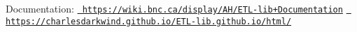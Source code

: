 Documentation\+: \href{https://wiki.bnc.ca/display/AH/ETL-lib+Documentation}{\texttt{ https\+://wiki.\+bnc.\+ca/display/\+A\+H/\+E\+T\+L-\/lib+\+Documentation}} \href{https://charlesdarkwind.github.io/ETL-lib.github.io/html/}{\texttt{ https\+://charlesdarkwind.\+github.\+io/\+E\+T\+L-\/lib.\+github.\+io/html/}} 